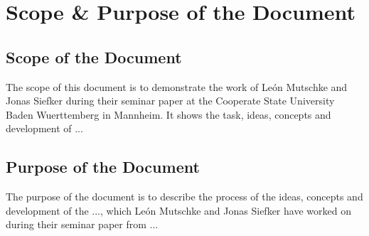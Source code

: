 

\chapter*{Scope \& Purpose of the Document}

\section*{Scope of the Document}
  The scope of this document is to demonstrate the work of Le\'{o}n Mutschke and Jonas Siefker during their seminar paper at the Cooperate State University Baden Wuerttemberg in Mannheim. It shows the task, ideas, concepts and development of ... %

\section*{Purpose of the Document}
  The purpose of the document is to describe the process of the ideas, concepts and development of the ..., which Le\'{o}n Mutschke and Jonas Siefker have worked on during their seminar paper from ... %